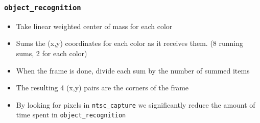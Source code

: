 \documentclass{beamer}
\begin{document}
\begin{frame}
	\frametitle{{\tt object\_recognition}}

	\begin{itemize}
		\item Take linear weighted center of mass for each color
		\item Sums the (x,y) coordinates for each color as it receives them. (8 running sums, 2 for each color)
		\item When the frame is done, divide each sum by the number of summed items
		\item The resulting 4 (x,y) pairs are the corners of the frame
		\item By looking for pixels in {\tt ntsc\_capture} we significantly reduce the amount of time spent in {\tt object\_recognition}
	\end{itemize}
\end{frame}

\end{document}
